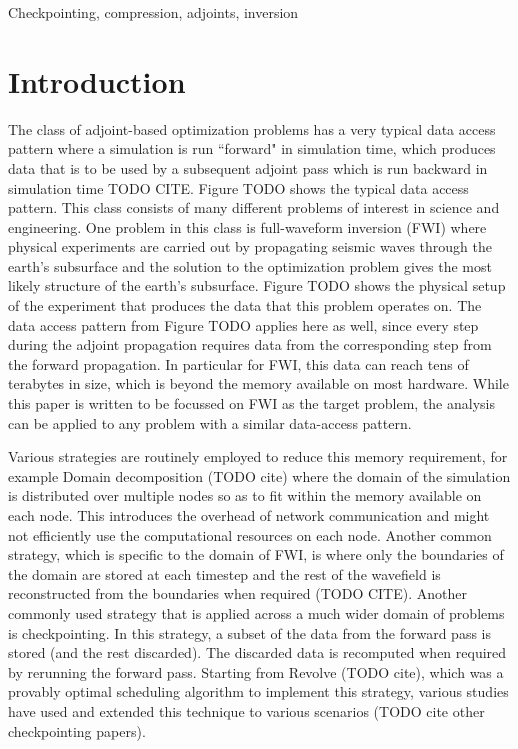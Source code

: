 \documentclass[conference]{IEEEtran}
\begin{document}
\begin{IEEEkeywords}
Checkpointing, compression, adjoints, inversion
\end{IEEEkeywords}

\section{Introduction}
The class of adjoint-based optimization problems has a very typical data access pattern where a
simulation is run ``forward" in simulation time, which produces data that is to be used by a
subsequent adjoint pass which is run backward in simulation time TODO CITE. Figure TODO
shows the typical data access pattern. This class consists of many different problems of interest in
science and engineering. One problem in this class is full-waveform inversion (FWI) where physical
experiments are carried out by propagating seismic waves through the earth's subsurface and the
solution to the optimization problem gives the most likely structure of the earth's subsurface. Figure
TODO shows the physical setup of the experiment that produces the data that this problem operates
on. The data access pattern from Figure TODO applies here as well, since every step during the
adjoint propagation requires data from the corresponding step from the forward propagation. In
particular for FWI, this data can reach tens of terabytes in size, which is beyond the memory
available on most hardware. While this paper is written to be focussed on FWI as the target problem, 
the analysis can be applied to any problem with a similar data-access pattern. 


Various strategies are routinely employed to reduce this memory requirement, for example 
Domain decomposition (TODO cite) where the domain of the simulation is distributed over
multiple nodes so as to fit within the memory available on each node. This introduces the overhead
of network communication and might not efficiently use the computational resources on each node.
Another common strategy, which is specific to the domain of FWI, is where only the boundaries of
the domain are stored at each timestep and the rest of the wavefield is reconstructed from the
boundaries when required (TODO CITE). Another commonly used strategy that is applied across
a much wider domain of problems is checkpointing. In this strategy, a subset of the data from the
forward pass is stored (and the rest discarded). The discarded data is recomputed when required
by rerunning the forward pass. Starting from Revolve (TODO cite), which was a provably optimal
scheduling algorithm to implement this strategy, various studies have used and extended this
technique to various scenarios (TODO cite other checkpointing papers). 
\end{document}
